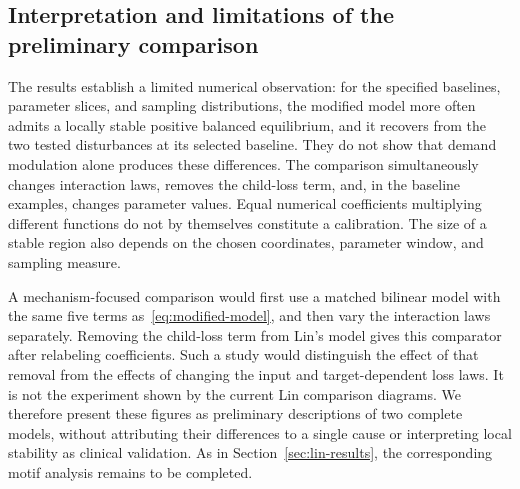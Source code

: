 \subsection{Interpretation and limitations of the preliminary comparison}
The results establish a limited numerical observation: for the specified
baselines, parameter slices, and sampling distributions, the modified
model more often admits a locally stable positive balanced equilibrium,
and it recovers from the two tested disturbances at its selected baseline.
They do not show that demand modulation alone produces these differences.
The comparison simultaneously changes interaction laws, removes the
child-loss term, and, in the baseline examples, changes parameter values.
Equal numerical coefficients multiplying different functions do not by
themselves constitute a calibration. The size of a stable region also
depends on the chosen coordinates, parameter window, and sampling measure.

A mechanism-focused comparison would first use a matched bilinear model
with the same five terms as~\eqref{eq:modified-model}, and then vary the
interaction laws separately. Removing the child-loss term from Lin's
model gives this comparator after relabeling coefficients. Such a study
would distinguish the effect of that removal from the effects of changing
the input and target-dependent loss laws. It is not the experiment shown
by the current Lin comparison diagrams. We therefore present these
figures as preliminary descriptions of two complete models, without
attributing their differences to a single cause or interpreting local
stability as clinical validation. As in Section~\ref{sec:lin-results},
the corresponding motif analysis remains to be completed.

